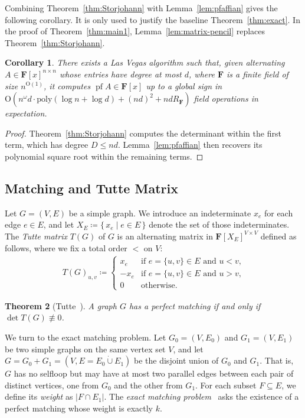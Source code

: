 \documentclass[11pt, a4paper]{article}
\theoremstyle{plain}
\newtheorem{theorem}{Theorem}[section]
\newtheorem{corollary}[theorem]{Corollary}
\theoremstyle{definition}
\theoremstyle{remark}
\newcommand{\bF}{\mathbf{F}}
\DeclareMathOperator{\pf}{pf}
\begin{document}
Combining Theorem~\ref{thm:Storjohann} with Lemma~\ref{lem:pfaffian} gives the following corollary.
It is only used to justify the baseline Theorem~\ref{thm:exact}.
In the proof of Theorem~\ref{thm:main1}, Lemma~\ref{lem:matrix-pencil} replaces Theorem~\ref{thm:Storjohann}.

\begin{corollary}\label{cor:compute_pfaffian_general}
There exists a Las Vegas algorithm such that, given alternating $A\in\bF[x]^{n\times n}$ whose entries have degree at most $d$, where $\bF$ is a finite field of size $n^{\mathrm{O}(1)}$, 
it computes $\pf A \in \bF[x]$ up to a global sign in $\mathrm{O}(n^\omega d \cdot \mathrm{poly}(\log n+\log d) +(nd)^2+ndR_{\bF})$ field operations in expectation.
\end{corollary}

\begin{proof}
Theorem~\ref{thm:Storjohann} computes the determinant within the first term, which has degree $D \le nd$.
Lemma~\ref{lem:pfaffian} then recovers its polynomial square root within the remaining terms.
\end{proof}



\subsection{Matching and Tutte Matrix}
Let $G = (V, E)$ be a simple graph.
We introduce an indeterminate $x_e$ for each edge $e \in E$, and let $X_E \coloneqq \{\, x_e \mid e \in E \,\}$ denote the set of those indeterminates.
The \emph{Tutte matrix} $T(G)$ of $G$ is an alternating matrix in $\bF[X_E]^{V \times V}$ defined as follows, where we fix a total order $<$ on $V$: 
\begin{align*}
    T(G)_{u, v} \coloneqq \begin{cases}
        x_e & \text{if $e = \{u, v\} \in E$ and $u < v$,}\\
        -x_e & \text{if $e = \{u, v\} \in E$ and $u > v$,}\\
        0 & \text{otherwise.}
    \end{cases}
\end{align*}

\begin{theorem}[Tutte~\cite{Tutte1947}]\label{thm:Tutte}
    A graph $G$ has a perfect matching if and only if $\det T(G) \not\equiv 0$.
\end{theorem}

We turn to the exact matching problem.
Let $G_0 = (V, E_0)$ and $G_1 = (V, E_1)$ be two simple graphs on the same vertex set $V$, and let $G = G_0 + G_1 = (V, E = E_0 \dot\cup E_1)$ be the disjoint union of $G_0$ and $G_1$.
That is, $G$ has no selfloop but may have at most two parallel edges between each pair of distinct vertices, one from $G_0$ and the other from $G_1$.
For each subset $F \subseteq E$, we define its \emph{weight} as $|F \cap E_1|$.
The \emph{exact matching problem}~\cite{PY1982} asks the existence of a perfect matching whose weight is exactly $k$.
\end{document}
